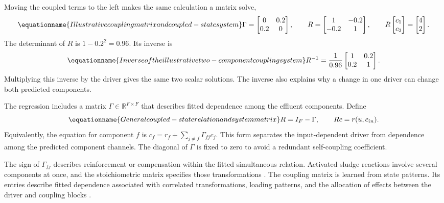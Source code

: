 Moving the coupled terms to the left makes the same calculation a matrix solve,
\begin{equation}
\equationname{Illustrative coupling matrix and coupled-state system}
\label{eq:icsor_small_coupling_matrices}
\Gamma=\begin{bmatrix}0&0.2\\0.2&0\end{bmatrix},
\qquad
R=\begin{bmatrix}1&-0.2\\-0.2&1\end{bmatrix},
\qquad
R\begin{bmatrix}c_1\\c_2\end{bmatrix}=\begin{bmatrix}4\\2\end{bmatrix}.
\end{equation}
The determinant of \(R\) is \(1-0.2^2=0.96\). Its inverse is
\begin{equation}
\equationname{Inverse of the illustrative two-component coupling system}
\label{eq:icsor_small_coupling_inverse}
R^{-1}=\frac{1}{0.96}\begin{bmatrix}1&0.2\\0.2&1\end{bmatrix}.
\end{equation}
Multiplying this inverse by the driver gives the same two scalar solutions. The inverse also explains why a change in one driver can change both predicted components.

The regression includes a matrix \(\Gamma\in\mathbb{R}^{F\times F}\) that describes fitted dependence among the effluent components. Define
\begin{equation}
\equationname{General coupled-state relation and system matrix}
\label{eq:icsor_coupled_relation}
R=I_F-\Gamma,
\qquad Rc=r(u,c_{in}).
\end{equation}
Equivalently, the equation for component \(f\) is \(c_f=r_f+\sum_{j\neq f}\Gamma_{fj}c_j\). This form separates the input-dependent driver from dependence among the predicted component channels. The diagonal of \(\Gamma\) is fixed to zero to avoid a redundant self-coupling coefficient.

The sign of \(\Gamma_{fj}\) describes reinforcement or compensation within the fitted simultaneous relation. Activated sludge reactions involve several components at once, and the stoichiometric matrix specifies those transformations \citep{Henze2006}. The coupling matrix is learned from state patterns. Its entries describe fitted dependence associated with correlated transformations, loading patterns, and the allocation of effects between the driver and coupling blocks \citep{Selerio2026}.

